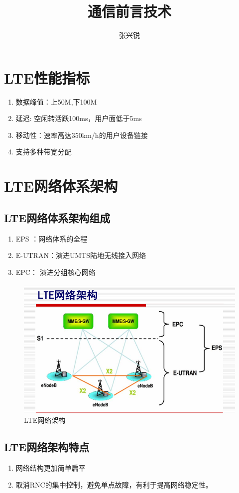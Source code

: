 \documentclass{article}
\begin{document}
	\title{通信前言技术}
	\author{张兴锐}
	\date{}
	\section{LTE性能指标}
	\begin{enumerate}
		\item 数据峰值：上50M,下100M
		\item 延迟: 空闲转活跃100ms，用户面低于5ms
		\item 移动性：速率高达350km/h的用户设备链接
		\item 支持多种带宽分配
	\end{enumerate}
	\section{LTE网络体系架构}
	\subsection{LTE网络体系架构组成}
	\begin{enumerate}
		\item EPS ：网络体系的全程
		\item E-UTRAN：演进UMTS陆地无线接入网络
		\item EPC： 演进分组核心网络
	\end{enumerate}
	\begin{figure}[H]
		\centering
		\includegraphics[width=0.7\linewidth]{LTE网络架构}
		\caption{LTE网络架构}
		\label{fig:lte}
	\end{figure}
	\subsection{LTE网络架构特点}
	\begin{enumerate}
		\item 网络结构更加简单扁平
		\item 取消RNC的集中控制，避免单点故障，有利于提高网络稳定性。
	\end{enumerate}
\end{document}
